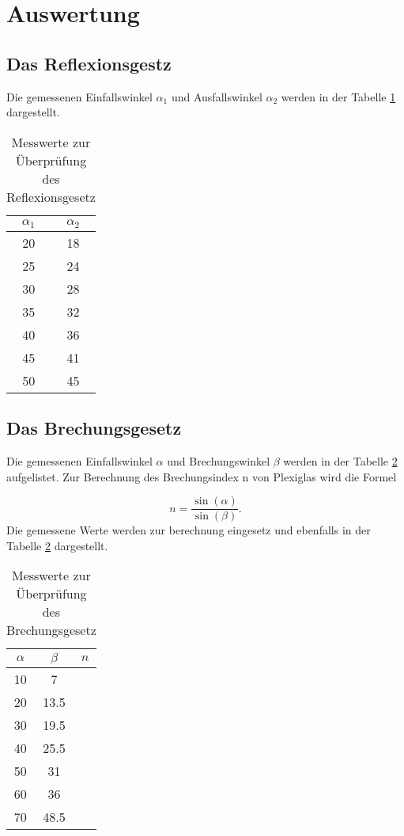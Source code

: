 \section{Auswertung}
\label{sec:Auswertung}

\subsection{Das Reflexionsgestz}
\label{sec:Reflexionsgesetz}

Die gemessenen Einfallswinkel $\alpha_1$ und Ausfallswinkel $\alpha_2$ werden in der Tabelle \ref{tab:Ref} dargestellt.

\begin{table}[H]
  \centering
  \caption{Messwerte zur Überprüfung des Reflexionsgesetz}
  \label{tab:Ref}
  \begin{tabular}{c c}
    \toprule
    $\alpha_1$ & $\alpha_2$ \\
    \midrule
    20 & 18 \\
    25 & 24 \\
    30 & 28 \\
    35 & 32 \\
    40 & 36 \\
    45 & 41 \\
    50 & 45 \\
    \bottomrule
  \end{tabular}
\end{table}
    
\subsection{Das Brechungsgesetz}
\label{sec:Brechungsgesetz}

Die gemessenen Einfallswinkel $\alpha$ und Brechungswinkel $\beta$ werden in der Tabelle \ref{tab:Bre} aufgelistet.
Zur Berechnung des Brechungsindex n von Plexiglas wird die Formel

\begin{equation}
  n = \frac{\sin(\alpha)}{\sin(\beta)}.
\end{equation}
Die gemessene Werte werden zur berechnung eingesetz und ebenfalls in der Tabelle \ref{tab:Bre} dargestellt.

\begin{table}[H]
  \centering
  \caption{Messwerte zur Überprüfung des Brechungsgesetz}
  \label{tab:Bre}
  \begin{tabular}{c c c}
    \toprule
    $\alpha$ & $\beta$ & $n$\\
    \midrule
    10 & 7    & \\
    20 & 13.5 & \\
    30 & 19.5 & \\
    40 & 25.5 & \\
    50 & 31   & \\
    60 & 36   & \\
    70 & 48.5 & \\
    \bottomrule
  \end{tabular}
\end{table}

